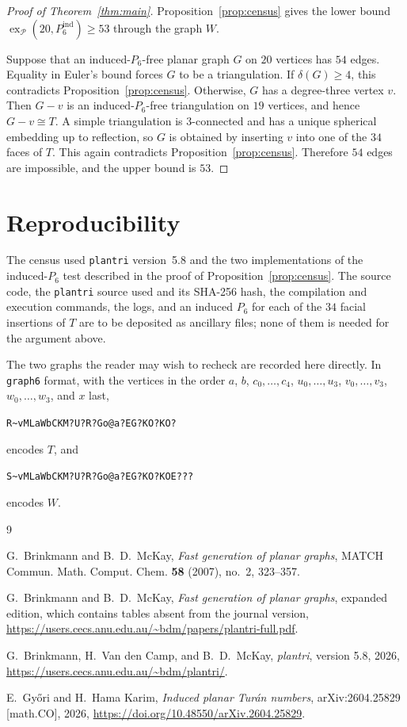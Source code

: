\documentclass[11pt]{amsart}
\newcommand{\cP}{\mathcal P}
\newcommand{\exP}{\operatorname{ex}_{\cP}}
\newcommand{\ind}{\mathrm{ind}}
\begin{document}
\begin{proof}[Proof of Theorem~\ref{thm:main}]
Proposition~\ref{prop:census} gives the lower bound
$\exP(20,P_6^{\ind})\geq 53$ through the graph $W$.

Suppose that an induced-$P_6$-free planar graph $G$ on $20$ vertices has
$54$ edges. Equality in Euler's bound forces $G$ to be a triangulation.
If $\delta(G)\geq 4$, this contradicts Proposition~\ref{prop:census}.
Otherwise, $G$ has a degree-three vertex $v$. Then $G-v$ is an
induced-$P_6$-free triangulation on $19$ vertices, and hence $G-v\cong T$.
A simple triangulation is $3$-connected and has a unique spherical embedding
up to reflection, so $G$ is obtained by inserting $v$ into one of the
$34$ faces of $T$. This again contradicts
Proposition~\ref{prop:census}. Therefore $54$ edges are impossible, and
the upper bound is $53$.
\end{proof}

\section*{Reproducibility}

The census used \texttt{plantri} version~5.8 \cite{Plantri} and the two
implementations of the induced-$P_6$ test described in the proof of
Proposition~\ref{prop:census}. The source code, the \texttt{plantri} source
used and its SHA-256 hash, the compilation and execution commands, the logs,
and an induced $P_6$ for each of the $34$ facial insertions of $T$ are to be
deposited as ancillary files; none of them is needed for the argument above.

The two graphs the reader may wish to recheck are recorded here directly. In
\texttt{graph6} format, with the vertices in the order
$a$, $b$, $c_0,\ldots,c_4$, $u_0,\ldots,u_3$, $v_0,\ldots,v_3$,
$w_0,\ldots,w_3$, and $x$ last,
\begin{center}
\verb+R~vMLaWbCKM?U?R?Go@a?EG?KO?KO?+
\end{center}
encodes $T$, and
\begin{center}
\verb+S~vMLaWbCKM?U?R?Go@a?EG?KO?KOE???+
\end{center}
encodes $W$.

\begin{thebibliography}{9}

G.~Brinkmann and B.~D.~McKay,
\emph{Fast generation of planar graphs},
MATCH Commun. Math. Comput. Chem. \textbf{58} (2007), no.~2, 323--357.

G.~Brinkmann and B.~D.~McKay,
\emph{Fast generation of planar graphs}, expanded edition, which contains
tables absent from the journal version,
\url{https://users.cecs.anu.edu.au/~bdm/papers/plantri-full.pdf}.

G.~Brinkmann, H.~Van den Camp, and B.~D.~McKay,
\emph{plantri}, version 5.8, 2026,
\url{https://users.cecs.anu.edu.au/~bdm/plantri/}.

E.~Gy\H{o}ri and H.~Hama Karim,
\emph{Induced planar Tur\'an numbers},
arXiv:2604.25829 [math.CO], 2026,
\url{https://doi.org/10.48550/arXiv.2604.25829}.

\end{thebibliography}
\end{document}
